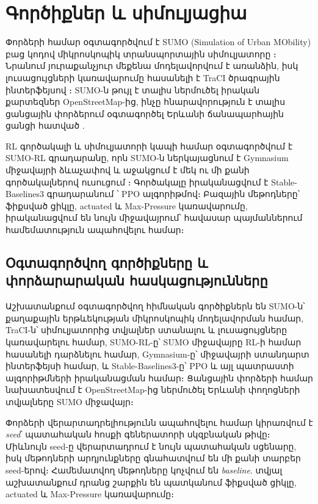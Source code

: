 \documentclass[12pt,a4paper]{extreport}
\begin{document}
\section{Գործիքներ և սիմուլյացիա}

Փորձերի համար օգտագործվում է SUMO (Simulation of Urban MObility) բաց կոդով միկրոսկոպիկ տրանսպորտային սիմուլյատորը \cite{lopez2018}։ Նրանում յուրաքանչյուր մեքենա մոդելավորվում է առանձին, իսկ լուսացույցների կառավարումը հասանելի է TraCI ծրագրային ինտերֆեյսով \cite{traciDocs}։ SUMO-ն թույլ է տալիս ներմուծել իրական քարտեզներ OpenStreetMap-ից, ինչը հնարավորություն է տալիս ցանցային փորձերում օգտագործել Երևանի ճանապարհային ցանցի հատված \cite{sumoDocs,openstreetmap}.


RL գործակալի և սիմուլյատորի կապի համար օգտագործվում է SUMO-RL գրադարանը, որն SUMO-ն ներկայացնում է Gymnasium միջավայրի ձևաչափով և աջակցում է մեկ ու մի քանի գործակալներով ուսուցում \cite{sumorl,gymnasium}։ Գործակալը իրականացվում է Stable-Baselines3 գրադարանում \cite{raffin2021}՝ PPO ալգորիթմով։ Բազային մեթոդները՝ ֆիքսված ցիկլը, actuated և Max-Pressure կառավարումը, իրականացվում են նույն միջավայրում՝ հավասար պայմաններում համեմատություն ապահովելու համար։

\subsection{Օգտագործվող գործիքները և փորձարարական հասկացությունները}

Աշխատանքում օգտագործվող հիմնական գործիքներն են SUMO-ն՝ քաղաքային երթևեկության միկրոսկոպիկ մոդելավորման համար, TraCI-ն՝ սիմուլյատորից տվյալներ ստանալու և լուսացույցները կառավարելու համար, SUMO-RL-ը՝ SUMO միջավայրը RL-ի համար հասանելի դարձնելու համար, Gymnasium-ը՝ միջավայրի ստանդարտ ինտերֆեյսի համար, և Stable-Baselines3-ը՝ PPO և այլ պատրաստի ալգորիթմների իրականացման համար։ Ցանցային փորձերի համար նախատեսվում է OpenStreetMap-ից ներմուծել Երևանի փողոցների տվյալները SUMO միջավայր։

Փորձերի վերարտադրելիությունն ապահովելու համար կիրառվում է \textit{seed}՝ պատահական հոսքի գեներատորի սկզբնական թիվը։ Միևնույն seed-ը վերարտադրում է նույն պատահական սցենարը, իսկ մեթոդների արդյունքները գնահատվում են մի քանի տարբեր seed-երով։ Համեմատվող մեթոդները կոչվում են \textit{baseline}. տվյալ աշխատանքում դրանց շարքին են պատկանում ֆիքսված ցիկլը, actuated և Max-Pressure կառավարումը։
\end{document}
